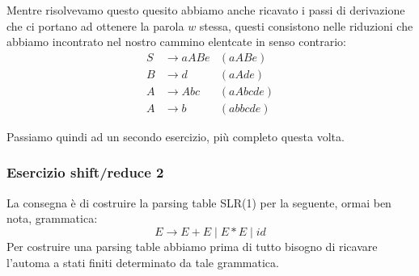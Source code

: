 \documentclass[class=book, crop=false, oneside, 12pt]{standalone}
\begin{document}
Mentre risolvevamo questo quesito abbiamo anche ricavato i passi di derivazione che ci portano ad ottenere la parola \(w\) stessa, questi consistono nelle riduzioni che abbiamo incontrato nel nostro cammino elentcate in senso contrario:
\begin{align*}
    S &\to aABe &(aABe)\\
    B &\to d &(aAde)\\
    A &\to Abc &(aAbcde)\\
    A &\to b &(abbcde)
\end{align*}

Passiamo quindi ad un secondo esercizio, più completo questa volta.

\subsubsection{Esercizio shift/reduce 2}
La consegna è di costruire la parsing table SLR(1) per la seguente, ormai ben nota, grammatica:
\begin{equation}
    \label{ex2-sh/re-grammar}
    E \to E+E \mid E*E \mid id
\end{equation} 
Per costruire una parsing table abbiamo prima di tutto bisogno di ricavare l'automa a stati finiti determinato da tale grammatica.
\end{document}
